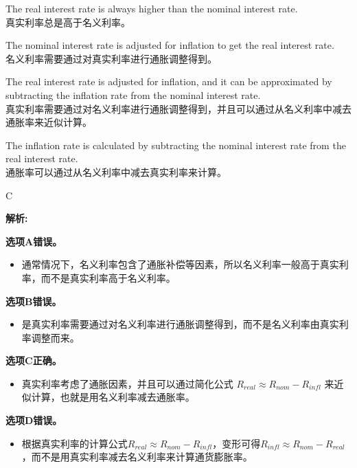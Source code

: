 \documentclass{article}
\newenvironment{explanation}
{\textbf{解析:}\par}
{\par}
\begin{document}
    \begin{choices}
        \item The real interest rate is always higher than the nominal interest rate.\\
        真实利率总是高于名义利率。
        \item The nominal interest rate is adjusted for inflation to get the real interest rate.\\
        名义利率需要通过对真实利率进行通胀调整得到。
        \item The real interest rate is adjusted for inflation, and it can be approximated by subtracting the inflation rate from the nominal interest rate.\\
        真实利率需要通过对名义利率进行通胀调整得到，并且可以通过从名义利率中减去通胀率来近似计算。
        \item The inflation rate is calculated by subtracting the nominal interest rate from the real interest rate.\\
        通胀率可以通过从名义利率中减去真实利率来计算。
    \end{choices}
    
    \begin{correctanswer}
    C
    \end{correctanswer}
    
    \begin{explanation}
    \textbf{选项A错误。}
    \begin{itemize}
    \item 通常情况下，名义利率包含了通胀补偿等因素，所以名义利率一般高于真实利率，而不是真实利率高于名义利率。
    \end{itemize}
    \textbf{选项B错误。}
    \begin{itemize}
    \item 是真实利率需要通过对名义利率进行通胀调整得到，而不是名义利率由真实利率调整而来。
    \end{itemize}
    \textbf{选项C正确。}
    \begin{itemize}
    \item 真实利率考虑了通胀因素，并且可以通过简化公式 $R_{real}\approx R_{nom}-R_{infl}$ 来近似计算，也就是用名义利率减去通胀率。
    \end{itemize}
    \textbf{选项D错误。}
    \begin{itemize}
        \item 根据真实利率的计算公式$R_{real}\approx R_{nom}-R_{infl}$，变形可得$R_{infl}\approx R_{nom}-R_{real}$ ，而不是用真实利率减去名义利率来计算通货膨胀率。
        \end{itemize}
    \end{explanation}
    
\end{document}
